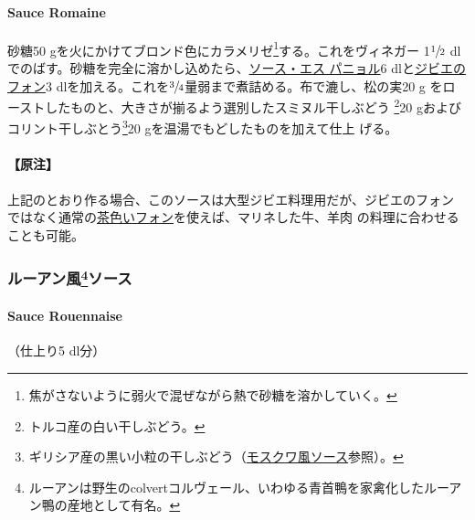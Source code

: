 \hypertarget{sauce-romaine}{%
\paragraph{Sauce Romaine}\label{sauce-romaine}}

砂糖50 gを火にかけてブロンド色にカラメリゼ\footnote{焦がさないように弱火で混ぜながら熱で砂糖を溶かしていく。}する。これをヴィネガー
1\(\sfrac{1}{2}\)
dlでのばす。砂糖を完全に溶かし込めたら、\protect\hyperlink{sauce-espagnole}{ソース・エス
パニョル}6 dlと\protect\hyperlink{fonds-de-gibier}{ジビエのフォン}3
dlを加える。これを\(\sfrac{3}{4}\)量弱まで煮詰める。布で漉し、松の実20 g
をローストしたものと、大きさが揃るよう選別したスミヌル干しぶどう
\footnote{トルコ産の白い干しぶどう。}20
gおよびコリント干しぶとう\footnote{ギリシア産の黒い小粒の干しぶどう（\protect\hyperlink{sauce-moscovite}{モスクワ風ソース}参照）。}20
gを温湯でもどしたものを加えて仕上 げる。

\hypertarget{ux539fux6ce8-8}{%
\paragraph{【原注】}\label{ux539fux6ce8-8}}

上記のとおり作る場合、このソースは大型ジビエ料理用だが、ジビエのフォン
ではなく通常の\protect\hyperlink{fonds-brun}{茶色いフォン}を使えば、マリネした牛、羊肉
の料理に合わせることも可能。

\maeaki

\hypertarget{ux30ebux30fcux30a2ux30f3ux98a884ux30bdux30fcux30b9}{%
\subsubsection[ルーアン風ソース]{\texorpdfstring{ルーアン風\footnote{ルーアンは野生のcolvertコルヴェール、いわゆる青首鴨を家禽化したルーアン鴨の産地として有名。}ソース}{ルーアン風ソース}}\label{ux30ebux30fcux30a2ux30f3ux98a884ux30bdux30fcux30b9}}

\hypertarget{sauce-rouennaise}{%
\paragraph{Sauce Rouennaise}\label{sauce-rouennaise}}


（仕上り5 dl分）

